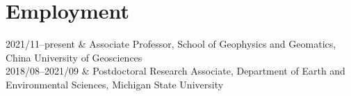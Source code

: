 \section{Employment}

\begin{EntriesTable}{0.18}{0.02}{0.80}
2021/11--present & Associate Professor, School of Geophysics and Geomatics, China University of Geosciences \\
2018/08--2021/09 & Postdoctoral Research Associate, Department of Earth and Environmental Sciences, Michigan State University \\
\end{EntriesTable}
